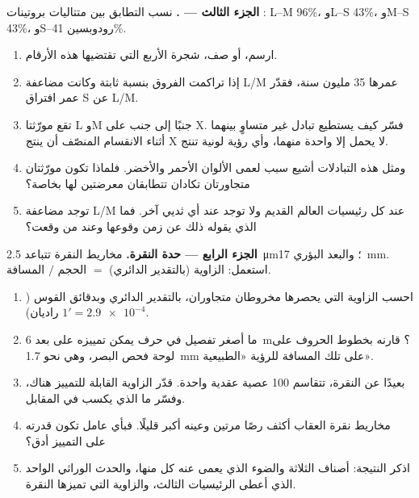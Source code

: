 \begin{problem}
\medskip
\noindent\textbf{الجزء الثالث --- .}
نسب التطابق بين متتاليات بروتينات : L--M 96\%، وL--S 43\%،
وM--S 43\%، وS--رودوبسين 41\%.
\begin{enumerate}[resume]
  \item ارسم، أو صف، شجرة  الأربع التي تقتضيها هذه الأرقام.
  \item إذا تراكمت الفروق بنسبة ثابتة وكانت مضاعفة L/M عمرها 35 مليون
        سنة، فقدّر عمر افتراق S عن L/M.
  \item تقع مورّثتا L وM جنبًا إلى جنب على  X. فسّر كيف يستطيع
        تبادل غير متساوٍ بينهما أثناء الانقسام المنصّف أن ينتج  X
        لا يحمل إلا واحدة منهما، وأي رؤية لونية تنتج.
  \item ومثل هذه التبادلات أشيع سبب لعمى الألوان الأحمر والأخضر.
        فلماذا تكون مورّثتان متجاورتان تكادان تتطابقان معرضتين لها
        بخاصة؟
  \item توجد مضاعفة L/M عند كل رئيسيات العالم القديم ولا توجد عند أي
        ثديي آخر. فما الذي يقوله ذلك عن زمن وقوعها وعند من وقعت؟
\end{enumerate}

\medskip
\noindent\textbf{الجزء الرابع --- حدة النقرة.}
مخاريط النقرة تتباعد \qty{2.5}{\micro m}؛ والبعد البؤري 
\qty{17}{mm}. استعمل: الزاوية (بالتقدير الدائري) $=$ الحجم $/$ المسافة.
\begin{enumerate}[resume]
  \item احسب الزاوية التي يحصرها مخروطان متجاوران، بالتقدير الدائري
        وبدقائق القوس ($1' = \num{2.9e-4}$ راديان).
  \item ما أصغر تفصيل في حرف يمكن تمييزه على بعد \qty{6}{m}؟ قارنه
        بخطوط الحروف على لوحة فحص البصر، وهي نحو \qty{1.7}{mm} على تلك
        المسافة للرؤية «الطبيعية».
  \item بعيدًا عن النقرة، تتقاسم 100 عصية  عقدية واحدة. قدّر
        الزاوية القابلة للتمييز هناك، وفسّر ما الذي يكسب في المقابل.
  \item مخاريط نقرة العقاب أكثف رصًا مرتين وعينه أكبر قليلًا. فبأي
        عامل تكون قدرته على التمييز أدق؟
  \item اذكر النتيجة: أصناف  الثلاثة والضوء الذي يعمى عنه كل
        منها، والحدث الوراثي الواحد الذي أعطى الرئيسيات الثالث،
        والزاوية التي تميزها النقرة.
\end{enumerate}
\end{problem}
